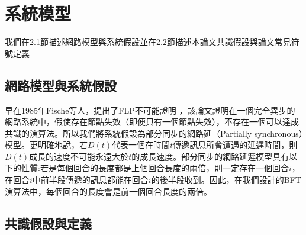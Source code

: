 \chapter{系統模型}\label{se_2}
我們在2.1節描述網路模型與系統假設並在2.2節描述本論文共識假設與論文常見符號定義
\section{網路模型與系統假設}\label{se_2} 

早在1985年Fische等人，提出了FLP不可能證明 \cite{fischer1982impossibility}，該論文證明在一個完全異步的網路系統中，假使存在節點失效（即便只有一個節點失效），不存在一個可以達成共識的演算法。所以我們將系統假設為部分同步的網路延（Partially synchronous）模型。更明確地說，若$D(t)$代表一個在時間$t$傳遞訊息所會遭遇的延遲時間，則$D(t)$成長的速度不可能永遠大於$t$的成長速度。部分同步的網路延遲模型具有以下的性質:若是每個回合的長度都是上個回合長度的兩倍，則一定存在一個回合$i$，在回合$i$中前半段傳遞的訊息都能在回合$i$的後半段收到。因此，在我們設計的BFT演算法中，每個回合的長度會是前一個回合長度的兩倍。

\section{共識假設與定義}\label{se_2} 

